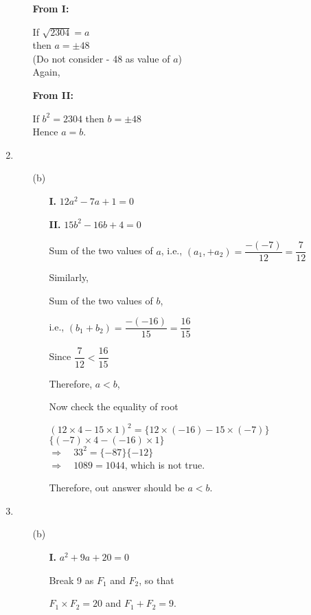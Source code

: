 \begin{multicols}{2}
\begin{enumerate}
\begin{itemize}
    \textbf{From I:}
    
    If $\sqrt{2304} = a$\\
    then $a = \pm 48$\\
    (Do not consider - 48 as value of $a$)\\
    Again,

    \textbf{From II:}

    If $b^2 = 2304$ then $b = \pm 48$\\
    Hence $a = b$.
  \end{itemize}
\item
  \begin{itemize}
  \item[(b)]
    \begin{itemize}
    \item[{\bf I.}] $12a^2 - 7a + 1 = 0$
    \item[{\bf II.}] $15b^2 - 16b + 4 = 0$

      Sum of the two values of $a$, i.e., $(a_{1}, + a_{2}) = \dfrac{-(-7)}{12} = \dfrac{7}{12}$

      Similarly,

      Sum of the two values of $b$,

      i.e., $(b_1 + b_2) = \dfrac{-(-16)}{15} = \dfrac{16}{15}$

      Since $\dfrac{7}{12} < \dfrac{16}{15}$

      Therefore, $a < b$,

      Now check the equality of root

      $(12 \times 4 - 15 \times 1)^2 = \{12 \times (-16) - 15 \times (-7)\}$\\
      $\{(-7) \times 4 -(-16) \times 1 \}$\\
      $\Rightarrow\quad 33^2 = \{-87\} \{-12\}$\\
      $\Rightarrow\quad 1089 = 1044$, which is not true.

      Therefore, out answer should be $a < b$.
    \end{itemize}
  \end{itemize}
\item
  \begin{itemize}
  \item[(b)]
    \begin{itemize}
    \item[{\bf I.}] $a^2 + 9a + 20 = 0$

      Break 9 as $F_1$ and $F_2$, so that

      $F_1 \times F_2 = 20$ and $F_1 + F_2 = 9$.


\end{itemize}
\end{itemize}
\end{enumerate}
\end{multicols}
